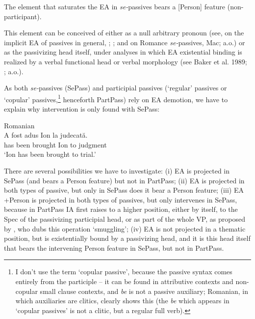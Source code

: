 \documentclass[output=paper]{langsci/langscibook}
\begin{document}
\ea%
    \label{ex:giurgea:26}
    The element that saturates the EA in \textit{se-}passives bears a [Person] feature (non-participant).
\z

This element can be conceived of either as a null arbitrary pronoun (see, on the implicit EA of passives in general, \citealt{Collins2005}; \citealt{Landau2010}; and on Romance \textit{se-}passives, Mac\citealt{Donald2017}; a.o.) or as the passivizing head itself, under analyses in which EA existential binding is realized by a verbal functional head or verbal morphology (see Baker et al. 1989; \citealt{Bruening2012}; a.o.).

As both \textit{se-}passives (SePass) and participial passives (‘regular’ passives or ‘copular’ passives,\footnote{I don’t use the term ‘copular passive’, because the passive syntax comes entirely from the participle – it can be found in attributive contexts and non-copular small clause contexts, and \textit{be} is not a passive auxiliary; Romanian, in which auxiliaries are clitics, clearly shows this (the \textit{be} which appears in ‘copular passives’ is not a clitic, but a regular full verb).} henceforth PartPass) rely on EA demotion, we have to explain why intervention is only found with SePass:

\ea%
    Romanian\label{ex:giurgea:27}\\
    \ex
    \gll A   fost  adus       Ion la judecată.\\
         has been brought Ion to judgment\\
    \glt ‘Ion has been brought to trial.’
    \z
\z


There are several possibilities we have to investigate: (i) EA is projected in SePass (and bears a Person feature) but not in PartPass; (ii) EA is projected in both types of passive, but only in SePass does it bear a Person feature; (iii) EA +Person is projected in both types of passives, but only intervenes in SePass, because in PartPass IA first raises to a higher position, either by itself, to the Spec of the passivizing participial head, or as part of the whole VP, as proposed by \citet{Collins2005}, who dubs this operation ‘smuggling’; (iv) EA is not projected in a thematic position, but is existentially bound by a passivizing head, and it is this head itself that bears the intervening Person feature in SePass, but not in PartPass.
\end{document}
